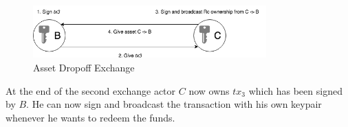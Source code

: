 \begin{figure}[h]
\centering
\includegraphics[width=0.8\textwidth]{images/exchange_02.png}
\caption{Asset Dropoff Exchange}
\label{fig:3 dropoff exchange}
\end{figure}

At the end of the second exchange actor $C$ now owns $tx_3$ which has been signed by $B$. He can now sign and broadcast the transaction with his own keypair whenever he wants to redeem the funds.
